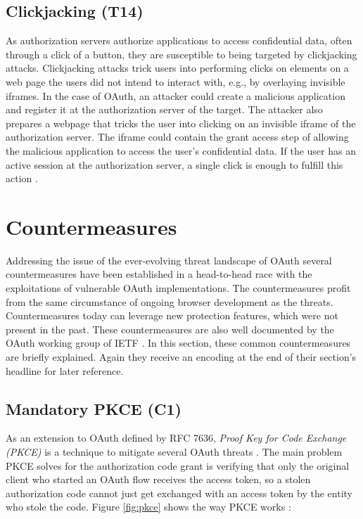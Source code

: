 \subsection[Clickjacking]{Clickjacking (T14)}
\label{threat:T14}
As authorization servers authorize applications to access confidential data, often through a click of a button, they are susceptible to being targeted by clickjacking attacks. Clickjacking attacks trick users into performing clicks on elements on a web page the users did not intend to interact with, e.g., by overlaying invisible iframes. In the case of OAuth, an attacker could create a malicious application and register it at the authorization server of the target. The attacker also prepares a webpage that tricks the user into clicking on an invisible iframe of the authorization server. The iframe could contain the grant access step of allowing the malicious application to access the user's confidential data. If the user has an active session at the authorization server, a single click is enough to fulfill this action \cite{gibbons2014security}. 


\section{Countermeasures}
\label{sec:oauth_countermeasures}
Addressing the issue of the ever-evolving threat landscape of OAuth several countermeasures have been established in a head-to-head race with the exploitations of vulnerable OAuth implementations. The countermeasures profit from the same circumstance of ongoing browser development as the threats. Countermeasures today can leverage new protection features, which were not present in the past. These countermeasures are also well documented by the OAuth working group of IETF \cite{lodderstedt2020oauth}. In this section, these common countermeasures are briefly explained. Again they receive an encoding at the end of their section's headline for later reference.

\subsection[Mandatory PKCE]{Mandatory PKCE (C1)}
\label{counter:C1}
As an extension to OAuth defined by RFC 7636, \emph{Proof Key for Code Exchange (PKCE)} is a technique to mitigate several OAuth threats \cite{bradley2015rfc}. The main problem PKCE solves for the authorization code grant is verifying that only the original client who started an OAuth flow receives the access token, so a stolen authorization code cannot just get exchanged with an access token by the entity who stole the code. Figure \ref{fig:pkce} shows the way PKCE works \cite{siriwardena_oauth_2020}:

